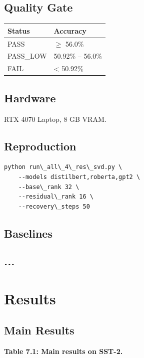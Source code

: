 \subsection{Quality Gate}

\begin{table}[H]
\centering
\small
\begin{tabular}{ll}
\toprule
\textbf{Status} & \textbf{Accuracy} \\
\midrule
PASS & $\ge$ 56.0\% \\
PASS\_LOW & 50.92\% -- 56.0\% \\
FAIL & \textless{} 50.92\% \\
\bottomrule
\end{tabular}
\end{table}

\subsection{Hardware}

RTX 4070 Laptop, 8 GB VRAM.

\subsection{Reproduction}

\begin{lstlisting}
python run\_all\_4\_res\_svd.py \
    --models distilbert,roberta,gpt2 \
    --base\_rank 32 \
    --residual\_rank 16 \
    --recovery\_steps 50
\end{lstlisting}

\subsection{Baselines}

\begin{lstlisting}

---
\end{lstlisting}

\section{Results}

\subsection{Main Results}

\textbf{Table 7.1: Main results on SST-2.}

